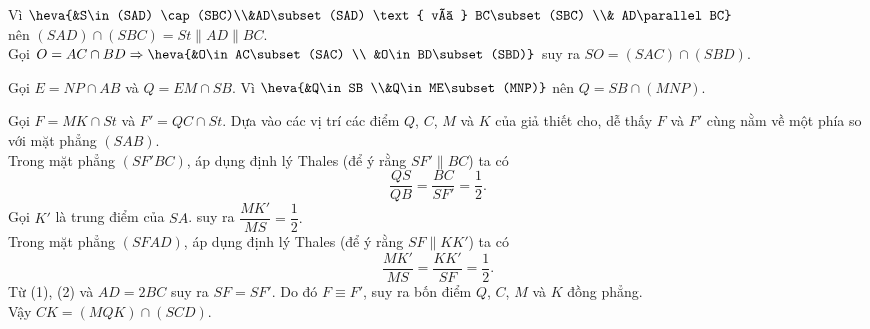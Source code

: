 \begin{bt}
{\begin{center}
		\end{center}
		\begin{listEX}
			\item Vì $ \heva{&S\in (SAD) \cap (SBC)\\&AD\subset (SAD) \text{ và } BC\subset (SBC) \\& AD\parallel BC} $\\ nên $ (SAD)\cap (SBC) = St \parallel AD \parallel BC $.\\
			Gọi $ O=AC\cap BD\Rightarrow \heva{&O\in AC\subset (SAC) \\ &O\in BD\subset (SBD)} $
			suy ra $ SO=(SAC)\cap (SBD) $.
			\item Gọi $ E=NP\cap AB $ và $ Q=EM\cap SB $.
			Vì $ \heva{&Q\in SB \\&Q\in ME\subset (MNP)} $ nên $ Q=SB\cap (MNP) $.
			\item Gọi $ F=MK\cap St $ và $ F'=QC\cap St $. Dựa vào các vị trí các điểm $ Q $, $ C $, $ M $ và $ K $ của giả thiết cho, dễ thấy $ F $ và $ F' $ cùng nằm về một phía so với mặt phẳng $ (SAB) $.\\
			Trong mặt phẳng $ (SF'BC) $, áp dụng định lý Thales (để ý rằng $ SF'\parallel BC $) ta có
			\[ \dfrac{QS}{QB}=\dfrac{BC}{SF'}=\dfrac{1}{2}. \tag {1}\]
			Gọi $ K' $ là trung điểm của $ SA $. suy ra $ \dfrac{MK'}{MS}=\dfrac{1}{2}. $\\
			Trong mặt phẳng $ (SFAD) $, áp dụng định lý Thales (để ý rằng $ SF\parallel KK' $) ta có
			\[ \dfrac{MK'}{MS}=\dfrac{KK'}{SF}=\dfrac{1}{2}. \tag {2}\]
			Từ (1), (2) và $ AD=2BC $ suy ra $ SF=SF' $. Do đó $ F\equiv F' $, suy ra bốn điểm $ Q $, $ C $, $ M $ và $ K $ đồng phẳng.\\
			Vậy $ CK=(MQK)\cap (SCD) $.
		\end{listEX}
	}
\end{bt}

